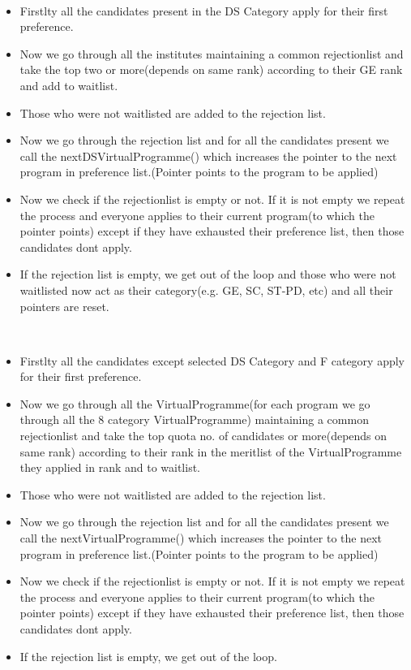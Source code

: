 \documentclass{article}
\begin{document}
\hspace*{5 mm} \\
\begin{itemize}
  \item Firstlty all the candidates present in the DS Category apply for their first preference.
  \item Now we go through all the institutes maintaining a common rejectionlist and take the top two or more(depends on same rank) according to their GE rank and add to waitlist.
  \item Those who were not waitlisted are added to the rejection list.
  \item Now we go through the rejection list and for all the candidates present we call the nextDSVirtualProgramme() which increases the pointer to the next program in preference list.(Pointer points to the program to be applied)
  \item Now we check if the rejectionlist is empty or not. If it is not empty we repeat the process and everyone applies to their current program(to which the pointer points) except if they have exhausted their preference list, then those candidates dont apply.
  \item If the rejection list is empty, we get out of the loop and those who were not waitlisted now act as their category(e.g. GE, SC, ST-PD, etc) and all their pointers are reset.
\end{itemize}
\pagebreak
\hspace*{5 mm}{\LARGE Now normal allocation takes place:}
\hspace*{5 mm} \\
\begin{itemize}
  \item Firstlty all the candidates except selected DS Category and F category apply for their first preference.
  \item Now we go through all the VirtualProgramme(for each program we go through all the 8 category VirtualProgramme) maintaining a common rejectionlist and take the top quota no. of candidates or more(depends on same rank) according to their rank in the meritlist of the VirtualProgramme they applied in rank and to waitlist.
  \item Those who were not waitlisted are added to the rejection list.
  \item Now we go through the rejection list and for all the candidates present we call the nextVirtualProgramme() which increases the pointer to the next program in preference list.(Pointer points to the program to be applied)
  \item Now we check if the rejectionlist is empty or not. If it is not empty we repeat the process and everyone applies to their current program(to which the pointer points) except if they have exhausted their preference list, then those candidates dont apply.
  \item If the rejection list is empty, we get out of the loop.
\end{itemize}
\end{document}
